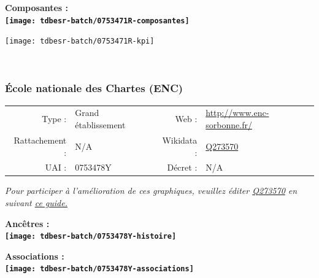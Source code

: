 \documentclass[12pt,french,]{article}
\begin{document}
\hrulefill

\begin{center} \bf Composantes : \\  
\texttt{[image: tdbesr-batch/0753471R-composantes]} \end{center}

\begin{center}\texttt{[image: tdbesr-batch/0753471R-kpi]} \end{center}\checkoddpage

\ifoddpage ~\newpage \fi   

\hypertarget{uxe9cole-nationale-des-chartes-enc}{%
\subsubsection{École nationale des Chartes
(ENC)}\label{uxe9cole-nationale-des-chartes-enc}}

\begin{tabular*}{\textwidth}{rp{5cm}rl}  
\hline  
Type : & Grand établissement & Web : &\href{http://www.enc-sorbonne.fr/}{http://www.enc-sorbonne.fr/} \\  
Rattachement : & N/A & Wikidata : & \href{https://www.wikidata.org/entity/Q273570}{Q273570} \\  
UAI : & 0753478Y & Décret : & N/A \\  
\hline  
\end{tabular*}

\textit{\scriptsize Pour participer à l'amélioration de ces graphiques, veuillez éditer  \href{https://www.wikidata.org/entity/Q273570}{Q273570}  en suivant \href{https://github.com/cpesr/wikidataESR/blob/master/Rmd/wikidataESR.md}{ce guide.}}

\vspace{1cm}  
\begin{minipage}[b]{0.50\textwidth}\begin{center} \bf Ancêtres : \\  
\texttt{[image: tdbesr-batch/0753478Y-histoire]} \end{center}\end{minipage}\begin{minipage}[b]{0.50\textwidth}\begin{center} \bf Associations : \\  
\texttt{[image: tdbesr-batch/0753478Y-associations]} \end{center}\end{minipage}

\hrulefill
\end{document}
